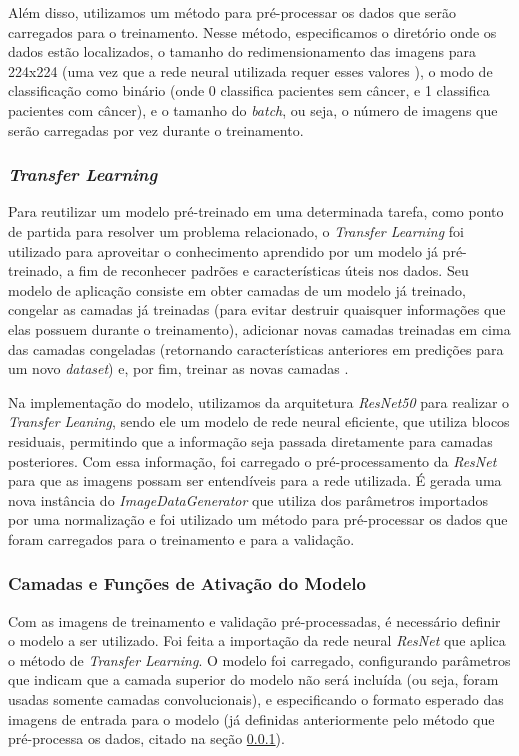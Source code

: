 Além disso, utilizamos um método para pré-processar os dados que serão carregados para o treinamento. Nesse método, especificamos o diretório onde os dados estão localizados, o tamanho do redimensionamento das imagens para 224x224 (uma vez que a rede neural utilizada requer esses valores ), o modo de classificação como binário (onde 0 classifica pacientes sem câncer, e 1 classifica pacientes com câncer), e o tamanho do \textit{batch}, ou seja, o número de imagens que serão carregadas por vez durante o treinamento.


\subsubsection{\esp \textit{Transfer Learning}} \label{transfer}
Para reutilizar um modelo pré-treinado em uma determinada tarefa, como ponto de partida para resolver um problema relacionado, o \textit{Transfer Learning} foi utilizado para aproveitar o conhecimento aprendido por um modelo já pré-treinado, a fim de reconhecer padrões e características úteis nos dados. Seu modelo de aplicação consiste em obter camadas de um modelo já treinado, congelar as camadas já treinadas (para evitar destruir quaisquer informações que elas possuem durante o treinamento), adicionar novas camadas treinadas em cima das camadas congeladas (retornando características anteriores em predições para um novo \textit{dataset}) e, por fim, treinar as novas camadas \cite{kerastl}.

Na implementação do modelo, utilizamos da arquitetura \textit{ResNet50} para realizar o \textit{Transfer Leaning}, sendo ele um modelo de rede neural eficiente, que utiliza blocos residuais, permitindo que a informação seja passada diretamente para camadas posteriores. Com essa informação, foi carregado o pré-processamento da \textit{ResNet} para que as imagens possam ser entendíveis para a rede utilizada. É gerada uma nova instância do \textit{ImageDataGenerator} que utiliza dos parâmetros importados por uma normalização e foi utilizado um método para pré-processar os dados que foram carregados para o treinamento e para a validação.



\subsubsection{\esp Camadas e Funções de Ativação do Modelo} \label{camadas}
Com as imagens de treinamento e validação pré-processadas, é necessário definir o modelo a ser utilizado. Foi feita a importação da rede neural \textit{ResNet} que aplica o método de \textit{Transfer Learning}. O modelo foi carregado, configurando parâmetros que indicam que a camada superior do modelo não será incluída (ou seja, foram usadas somente camadas convolucionais), e especificando o formato esperado das imagens de entrada para o modelo (já definidas anteriormente pelo método que pré-processa os dados, citado na seção \ref{transfer}).

